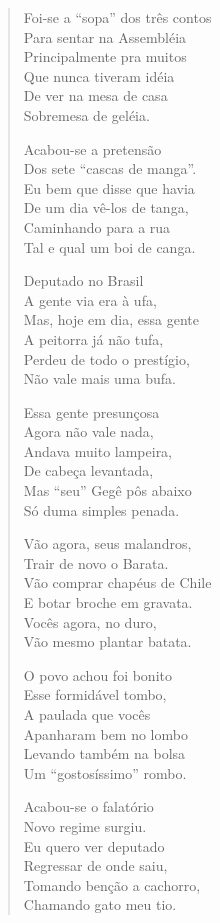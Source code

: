 \begin{verse}
Foi-se a “sopa” dos três contos\\
Para sentar na Assembléia\\
Principalmente pra muitos\\
Que nunca tiveram idéia\\
De ver na mesa de casa\\
Sobremesa de geléia.

Acabou-se a pretensão\\
Dos sete “cascas de manga”.\\
Eu bem que disse que havia\\
De um dia vê-los de tanga,\\
Caminhando para a rua\\
Tal e qual um boi de canga.


Deputado no Brasil\\
A gente via era à ufa,\\
Mas, hoje em dia, essa gente\\
A peitorra já não tufa,\\
Perdeu de todo o prestígio,\\
Não vale mais uma bufa.

Essa gente presunçosa\\
Agora não vale nada,\\
Andava muito lampeira,\\
De cabeça levantada,\\
Mas “seu” Gegê pôs abaixo\\
Só duma simples penada.

Vão agora, seus malandros,\\
Trair de novo o Barata.\\
Vão comprar chapéus de Chile\\
E botar broche em gravata.\\
Vocês agora, no duro,\\
Vão mesmo plantar batata.

O povo achou foi bonito\\
Esse formidável tombo,\\
A paulada que vocês\\
Apanharam bem no lombo\\
Levando também na bolsa\\
Um “gostosíssimo” rombo.


Acabou-se o falatório\\
Novo regime surgiu.\\
Eu quero ver deputado\\
Regressar de onde saiu,\\
Tomando benção a cachorro,\\
Chamando gato meu tio.


\end{verse}
